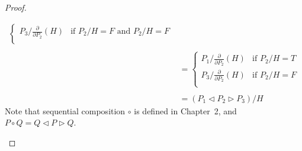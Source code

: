 \documentclass[a4paper,twoside,openright]{report}
\newcommand{\dd}[1]{\frac{\partial}{\partial #1}}
\newcommand{\lef}{\ensuremath{\triangleleft}}
\newcommand{\rig}{\ensuremath{\triangleright}}
\begin{document}
\begin{proof}
\begin{itemize}
\begin{align*}
\begin{cases}
P_3/\dd{P_2}(H) & \text{if $P_2/H=F$ and $P_2/H=F$}\\
\end{cases}\\\\
&=\begin{cases}
P_1/\dd{P_2}(H) & \text{if $P_2/H=T$}\\
P_3/\dd{P_2}(H) & \text{if $P_2/H=F$}\\
\end{cases}\\\\
&=(P_1\lef P_2\rig P_3)/H
\end{align*}
Note that sequential composition $\circ$ is defined in Chapter~2, and $P\circ Q=Q\lef P\rig Q$.
\end{itemize}
\end{proof}
\end{document}
